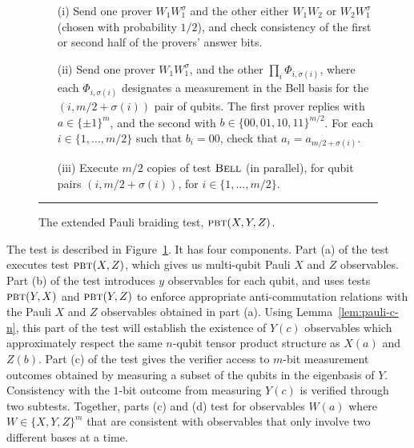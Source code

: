 \begin{figure}[H]
\begin{itemize}
\begin{enumerate}
\begin{enumerate}
\item[(i)] Send one prover $W_1 W_1^\sigma$ and the other either $W_1 W_2$ or $W_2W_1^\sigma$ (chosen with probability $1/2$), and check consistency of the first or second half of the provers' answer bits.
\item[(ii)] Send one prover $W_1  W_1^\sigma$, and the other $\prod_i \Phi_{i,\sigma(i)}$, where each $\Phi_{i,\sigma(i)}$ designates a measurement in the Bell basis for the $(i,m/2+\sigma(i))$ pair of qubits. 
    The first prover replies with $a\in\{\pm 1 \}^m$, and the second with $b\in \{00,01,10,11\}^{m/2}$. For each
    $i\in\{1,\ldots,m/2\}$ such that $b_i = 00$, check that $a_i  = a_{m/2+\sigma(i)}$. 
\item[(iii)] Execute $m/2$ copies of test $\textsc{Bell}$ (in parallel), for qubit pairs $(i,m/2+\sigma(i))$, for $i\in\{1,\ldots,m/2\}$. 
\end{enumerate}
\end{enumerate}
\end{itemize}
\rule[2ex]{\textwidth}{0.5pt}\vspace{-.5cm}
\caption{The extended Pauli braiding test, $\textsc{pbt}(X,Y,Z)$.}
\label{fig:e-pbt}
\end{figure}


The test is described in Figure~\ref{fig:e-pbt}. It has four components. Part (a) of the test executes test $\textsc{pbt}(X,Z)$, which gives us multi-qubit Pauli $X$ and $Z$ observables. Part (b) of the test introduces $y$ observables for each qubit, and uses tests $\textsc{pbt}(Y,X)$ and $\textsc{pbt}(Y,Z)$ to enforce appropriate anti-commutation relations with the Pauli $X$ and $Z$ observables obtained in part (a). Using Lemma~\ref{lem:pauli-c-n}, this part of the test will establish the existence of $Y(c)$ observables which approximately respect the same $n$-qubit tensor product structure as $X(a)$ and $Z(b)$. Part (c) of the test gives the verifier access to $m$-bit measurement outcomes obtained by measuring a subset of the qubits in the eigenbasis of $Y$. Consistency with the $1$-bit outcome from measuring $Y(c)$ is verified through two subtests. Together, parts (c) and (d) test for observables $W(a)$ where $W\in\{X,Y,Z\}^m$ that are consistent with observables that only involve two different bases at a time. 

